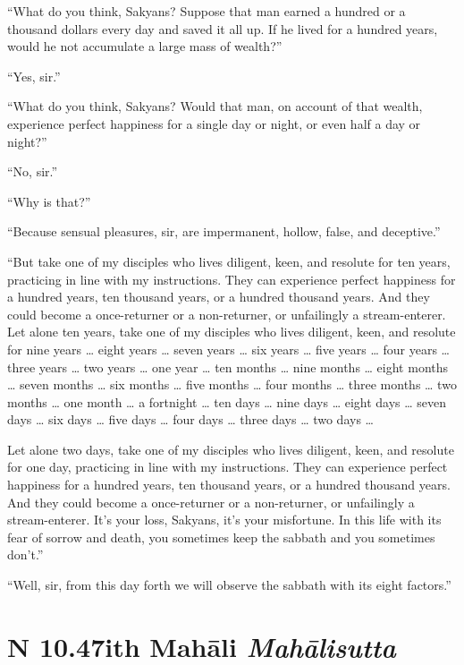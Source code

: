 \documentclass[12pt,openany]{book}%
\newcommand*{\suttatitleacronym}[1]{\smaller[2]{#1}\vspace*{.3em}}
\newcommand*{\suttatitletranslation}[1]{\linebreak{#1}}
\newcommand*{\suttatitleroot}[1]{\linebreak\smaller[2]\itshape{#1}}
\newcommand*{\tocacronym}[1]{\hspace*{-3.3em}{#1}\quad}
\newcommand*{\toctranslation}[1]{#1}
\newcommand*{\tocroot}[1]{(\textit{#1})}
\begin{document}
“What do you think, Sakyans? Suppose that man earned a hundred or a thousand dollars every day and saved it all up. If he lived for a hundred years, would he not accumulate a large mass of wealth?” 

“Yes, sir.” 

“What do you think, Sakyans? Would that man, on account of that wealth, experience perfect happiness for a single day or night, or even half a day or night?” 

“No, sir.” 

“Why is that?” 

“Because sensual pleasures, sir, are impermanent, hollow, false, and deceptive.” 

“But take one of my disciples who lives diligent, keen, and resolute for ten years, practicing in line with my instructions. They can experience perfect happiness for a hundred years, ten thousand years, or a hundred thousand years. And they could become a once-returner or a non-returner, or unfailingly a stream-enterer. Let alone ten years, take one of my disciples who lives diligent, keen, and resolute for nine years … eight years … seven years … six years … five years … four years … three years … two years … one year … ten months … nine months … eight months … seven months … six months … five months … four months … three months … two months … one month … a fortnight … ten days … nine days … eight days … seven days … six days … five days … four days … three days … two days … 

Let alone two days, take one of my disciples who lives diligent, keen, and resolute for one day, practicing in line with my instructions. They can experience perfect happiness for a hundred years, ten thousand years, or a hundred thousand years. And they could become a once-returner or a non-returner, or unfailingly a stream-enterer. It’s your loss, Sakyans, it’s your misfortune. In this life with its fear of sorrow and death, you sometimes keep the sabbath and you sometimes don’t.” 

“Well, sir, from this day forth we will observe the sabbath with its eight factors.” 

%
\section*{{\suttatitleacronym AN 10.47}{\suttatitletranslation With Mahāli }{\suttatitleroot Mahālisutta}}
\addcontentsline{toc}{section}{\tocacronym{AN 10.47} \toctranslation{With Mahāli } \tocroot{Mahālisutta}}
\end{document}
